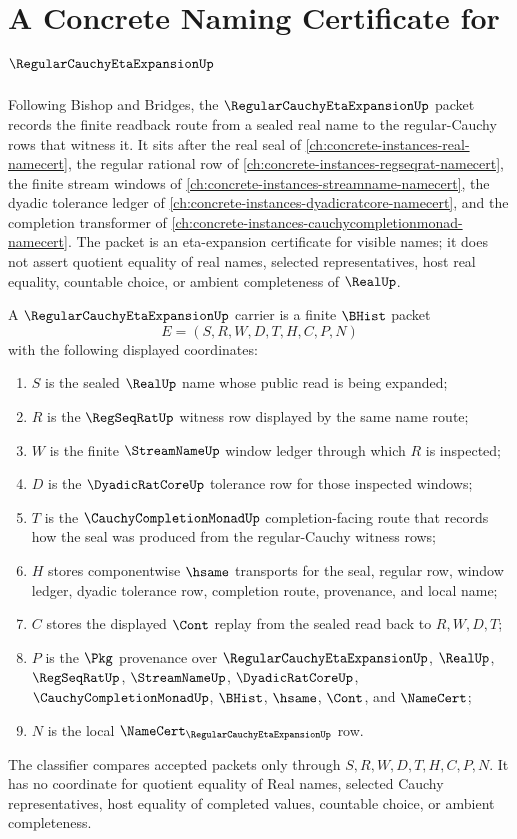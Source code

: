 \chapter{A Concrete Naming Certificate for $\RegularCauchyEtaExpansionUp$}
\label{ch:concrete-instances-regular-cauchy-eta-expansion-namecert}

Following Bishop and Bridges, the $\RegularCauchyEtaExpansionUp$ packet records the finite readback route from a sealed real name to the regular-Cauchy rows that witness it. It sits after the real seal of \autoref{ch:concrete-instances-real-namecert}, the regular rational row of \autoref{ch:concrete-instances-regseqrat-namecert}, the finite stream windows of \autoref{ch:concrete-instances-streamname-namecert}, the dyadic tolerance ledger of \autoref{ch:concrete-instances-dyadicratcore-namecert}, and the completion transformer of \autoref{ch:concrete-instances-cauchycompletionmonad-namecert}. The packet is an eta-expansion certificate for visible names; it does not assert quotient equality of real names, selected representatives, host real equality, countable choice, or ambient completeness of $\RealUp$.

\begin{definition}
\label{def:regular-cauchy-eta-expansion-carrier}
A $\RegularCauchyEtaExpansionUp$ carrier is a finite $\BHist$ packet
$$
E=(S,R,W,D,T,H,C,P,N)
$$
with the following displayed coordinates:
\begin{enumerate}
\item $S$ is the sealed $\RealUp$ name whose public read is being expanded;
\item $R$ is the $\RegSeqRatUp$ witness row displayed by the same name route;
\item $W$ is the finite $\StreamNameUp$ window ledger through which $R$ is inspected;
\item $D$ is the $\DyadicRatCoreUp$ tolerance row for those inspected windows;
\item $T$ is the $\CauchyCompletionMonadUp$ completion-facing route that records how the seal was produced from the regular-Cauchy witness rows;
\item $H$ stores componentwise $\hsame$ transports for the seal, regular row, window ledger, dyadic tolerance row, completion route, provenance, and local name;
\item $C$ stores the displayed $\Cont$ replay from the sealed read back to $R,W,D,T$;
\item $P$ is the $\Pkg$ provenance over $\RegularCauchyEtaExpansionUp$, $\RealUp$, $\RegSeqRatUp$, $\StreamNameUp$, $\DyadicRatCoreUp$, $\CauchyCompletionMonadUp$, $\BHist$, $\hsame$, $\Cont$, and $\NameCert$;
\item $N$ is the local $\NameCert_{\RegularCauchyEtaExpansionUp}$ row.
\end{enumerate}
The classifier compares accepted packets only through $S,R,W,D,T,H,C,P,N$. It has no coordinate for quotient equality of Real names, selected Cauchy representatives, host equality of completed values, countable choice, or ambient completeness.
\end{definition}

